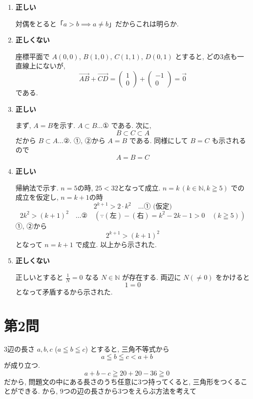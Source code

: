\documentclass[../main.tex]{subfiles}
\begin{document}
\noindent
[\textbf{解}]
\begin{enumerate}
  \item[(1)] \textbf{正しい}

    対偶をとると「$a > b \implies a \neq b$」だからこれは明らか.

  \item[(2)] \textbf{正しくない}

    座標平面で $A(0,0)$, $B(1,0)$, $C(1,1)$, $D(0,1)$ とすると, どの3点も一直線上にないが,
    \[
      \vec{AB} + \vec{CD} =
      \begin{pmatrix} 1 \\ 0
      \end{pmatrix} +
      \begin{pmatrix} -1 \\ 0
      \end{pmatrix} = \vec{0}
    \]
    である.

  \item[(3)] \textbf{正しい}

    まず, $A=B$を示す. $A \subset B \dots \text{①}$ である. 次に,
    \[
      B \subset C \subset A
    \]
    だから $B \subset A \dots \text{②}$. ①, ②から $A=B$ である. 同様にして $B=C$ も示されるので
    \[
      A=B=C
    \]

  \item[(4)] \textbf{正しい}

    帰納法で示す. $n=5$の時, $25 < 32$となって成立. $n=k \, (k \in \mathbb{N}, k \geqq 5)$ での成立を仮定し, $n=k+1$の時
    \[
      2^{k+1} > 2 \cdot k^2 \quad \dots \text{① (仮定)}
    \]
    \[
      2k^2 > (k+1)^2 \quad \dots \text{②} \quad (\because (\text{左}) - (\text{右}) = k^2 - 2k - 1 > 0 \quad (k \geqq 5))
    \]
    ①, ②から
    \[
      2^{k+1} > (k+1)^2
    \]
    となって $n=k+1$ で成立. 以上から示された.

  \item[(5)] \textbf{正しくない}

    正しいとすると $\frac{1}{N} = 0$ なる $N \in \mathbb{N}$ が存在する. 両辺に $N (\neq 0)$ をかけると
    \[
      1 = 0
    \]
    となって矛盾するから示された.
\end{enumerate}

\newpage

\section*{第2問}

\noindent
[\textbf{解}] 3辺の長さ $a, b, c$ ($a \leqq b \leqq c$) とすると, 三角不等式から
\[
  a \leqq b \leqq c < a + b
\]
が成り立つ.
\[
  a + b - c \geqq 20 + 20 - 36 \geqq 0
\]
だから, 問題文の中にある長さのうち任意に3つ持ってくると, 三角形をつくることができる. から, 9つの辺の長さから3つをえらぶ方法を考えて
\end{document}
